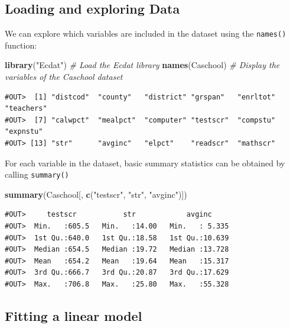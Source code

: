 \documentclass[]{book}
\newenvironment{Shaded}{\begin{snugshade}}{\end{snugshade}}
\newcommand{\KeywordTok}[1]{\textcolor[rgb]{0.13,0.29,0.53}{\textbf{#1}}}
\newcommand{\StringTok}[1]{\textcolor[rgb]{0.31,0.60,0.02}{#1}}
\newcommand{\CommentTok}[1]{\textcolor[rgb]{0.56,0.35,0.01}{\textit{#1}}}
\newcommand{\NormalTok}[1]{#1}
\theoremstyle{definition}
\theoremstyle{definition}
\theoremstyle{definition}
\theoremstyle{remark}
\begin{document}
\subsection{Loading and exploring
Data}\label{loading-and-exploring-data}

We can explore which variables are included in the dataset using the
\texttt{names()} function:

\begin{Shaded}
\begin{Highlighting}[]
\KeywordTok{library}\NormalTok{(}\StringTok{"Ecdat"}\NormalTok{) }\CommentTok{# Load the Ecdat library}
\KeywordTok{names}\NormalTok{(Caschool) }\CommentTok{# Display the variables of the Caschool dataset}
\end{Highlighting}
\end{Shaded}

\begin{verbatim}
#OUT>  [1] "distcod"  "county"   "district" "grspan"   "enrltot"  "teachers"
#OUT>  [7] "calwpct"  "mealpct"  "computer" "testscr"  "compstu"  "expnstu" 
#OUT> [13] "str"      "avginc"   "elpct"    "readscr"  "mathscr"
\end{verbatim}

For each variable in the dataset, basic summary statistics can be
obtained by calling \texttt{summary()}

\begin{Shaded}
\begin{Highlighting}[]
\KeywordTok{summary}\NormalTok{(Caschool[, }\KeywordTok{c}\NormalTok{(}\StringTok{"testscr"}\NormalTok{, }\StringTok{"str"}\NormalTok{, }\StringTok{"avginc"}\NormalTok{)])}
\end{Highlighting}
\end{Shaded}

\begin{verbatim}
#OUT>     testscr           str            avginc      
#OUT>  Min.   :605.5   Min.   :14.00   Min.   : 5.335  
#OUT>  1st Qu.:640.0   1st Qu.:18.58   1st Qu.:10.639  
#OUT>  Median :654.5   Median :19.72   Median :13.728  
#OUT>  Mean   :654.2   Mean   :19.64   Mean   :15.317  
#OUT>  3rd Qu.:666.7   3rd Qu.:20.87   3rd Qu.:17.629  
#OUT>  Max.   :706.8   Max.   :25.80   Max.   :55.328
\end{verbatim}

\subsection{Fitting a linear model}\label{fitting-a-linear-model}
\end{document}
